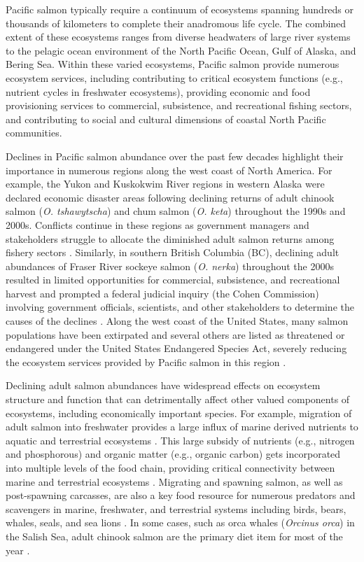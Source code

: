 Pacific salmon typically require a continuum of ecosystems spanning hundreds or
thousands of kilometers to complete their anadromous life cycle. The combined
extent of these ecosystems ranges from diverse headwaters of large river systems
to the pelagic ocean environment of the North Pacific Ocean, Gulf of Alaska, and
Bering Sea. Within these varied ecosystems, Pacific salmon provide numerous
ecosystem services, including contributing to critical ecosystem functions
(e.g., nutrient cycles in freshwater ecosystems), providing economic and food
provisioning services to commercial, subsistence, and recreational fishing
sectors, and contributing to social and cultural dimensions of coastal North
Pacific communities.

Declines in Pacific salmon abundance over the past few decades highlight their
importance in numerous regions along the west coast of North America. For
example, the Yukon and Kuskokwim River regions in western Alaska were declared
economic disaster areas following declining returns of adult chinook salmon
(\emph{O. tshawytscha}) and chum salmon (\emph{O. keta}) throughout the 1990s
and 2000s. Conflicts continue in these regions as government managers and
stakeholders struggle to allocate the diminished adult salmon returns among
fishery sectors \citep{Ebbin2002, Ebbin2003}. Similarly, in southern British
Columbia (BC), declining adult abundances of Fraser River sockeye salmon
(\emph{O. nerka}) throughout the 2000s resulted in limited opportunities for
commercial, subsistence, and recreational harvest and prompted a federal
judicial inquiry (the Cohen Commission) involving government officials,
scientists, and other stakeholders to determine the causes of the declines
\citep{Cohen2012}. Along the west coast of the United States, many salmon
populations have been extirpated and several others are listed as threatened or
endangered under the United States Endangered Species Act, severely reducing the
ecosystem services provided by Pacific salmon in this region \citep{Nehlsen1991,
NMFS2015, Williams2011b}.

Declining adult salmon abundances have widespread effects on ecosystem structure
and function that can detrimentally affect other valued components of
ecosystems, including economically important species. For example, migration of
adult salmon into freshwater provides a large influx of marine derived nutrients
to aquatic and terrestrial ecosystems \citep{Claeson2006, Johnston2004,
Chaloner2002}. This large subsidy of nutrients (e.g., nitrogen and phosphorous)
and organic matter (e.g., organic carbon) gets incorporated into multiple levels
of the food chain, providing critical connectivity between marine and
terrestrial ecosystems \citep{Claeson2006, Johnston2004}. Migrating and spawning
salmon, as well as post-spawning carcasses, are also a key food resource for
numerous predators and scavengers in marine, freshwater, and terrestrial systems
including birds, bears, whales, seals, and sea lions \citep{Ford2016,
Olesiuk1993a, Trites2007a, Hilderbrand1999b}. In some cases, such as orca whales
(\emph{Orcinus orca}) in the Salish Sea, adult chinook salmon are the primary
diet item for most of the year \citep{Ford2016}.

